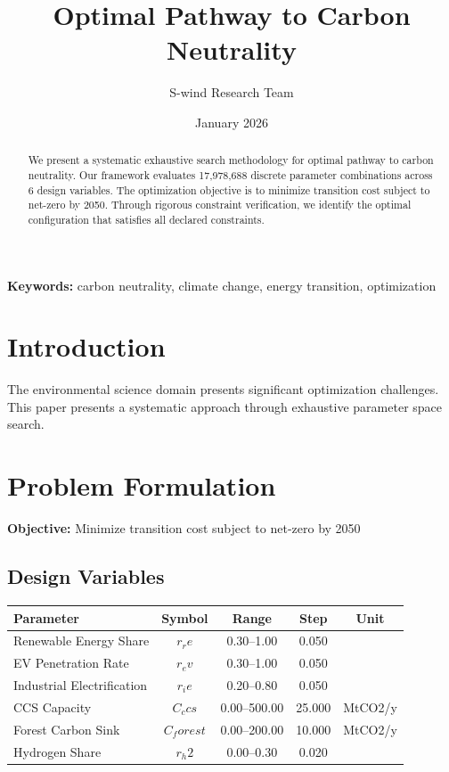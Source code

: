 \documentclass[11pt,a4paper]{article}
\title{Optimal Pathway to Carbon Neutrality}
\author{S-wind Research Team}
\date{January 2026}
\begin{document}
\maketitle

\begin{abstract}
We present a systematic exhaustive search methodology for optimal pathway to carbon neutrality. Our framework evaluates 17,978,688 discrete parameter combinations across 6 design variables. The optimization objective is to minimize transition cost subject to net-zero by 2050. Through rigorous constraint verification, we identify the optimal configuration that satisfies all declared constraints.
\end{abstract}

\textbf{Keywords:} carbon neutrality, climate change, energy transition, optimization

\section{Introduction}

The environmental science domain presents significant optimization challenges. This paper presents a systematic approach through exhaustive parameter space search.

\section{Problem Formulation}

\textbf{Objective:} Minimize transition cost subject to net-zero by 2050

\subsection{Design Variables}

\begin{center}
\begin{tabular}{|l|c|c|c|c|}
\hline
Parameter & Symbol & Range & Step & Unit \\
\hline
Renewable Energy Share & $r_re$ & 0.30--1.00 & 0.050 &  \\
EV Penetration Rate & $r_ev$ & 0.30--1.00 & 0.050 &  \\
Industrial Electrification & $r_ie$ & 0.20--0.80 & 0.050 &  \\
CCS Capacity & $C_ccs$ & 0.00--500.00 & 25.000 & MtCO2/y \\
Forest Carbon Sink & $C_forest$ & 0.00--200.00 & 10.000 & MtCO2/y \\
Hydrogen Share & $r_h2$ & 0.00--0.30 & 0.020 &  \\
\hline
\end{tabular}
\end{center}
\end{document}

